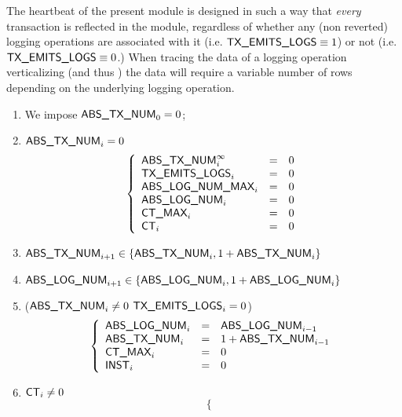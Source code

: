 The heartbeat of the present module is designed in such a way that \emph{every} transaction is reflected in the \logInfoMod{} module, regardless of whether any (non reverted) logging operations are associated with it (i.e. $\textsf{TX\_EMITS\_LOGS} \equiv 1$) or not (i.e. $\textsf{TX\_EMITS\_LOGS} \equiv 0$.) When tracing the data of a logging operation verticalizing (and thus \maxCt{}) the data will require a variable number of rows depending on the underlying logging operation. 
\begin{enumerate}
	\item We impose $\textsf{ABS\_TX\_NUM}_{0} = 0$;
	\item \If $\textsf{ABS\_TX\_NUM}_{i} = 0$ \Then
		\[
			\left\{ \begin{array}{lcl}
				\textsf{ABS\_TX\_NUM}^\infty_{i}          & = & 0 \\
				\textsf{TX\_EMITS\_LOGS}_{i}          & = & 0 \\
				\textsf{ABS\_LOG\_NUM\_MAX}_{i}         & = & 0 \\
				\textsf{ABS\_LOG\_NUM}_{i}            & = & 0 \\
				\textsf{CT\_MAX}_{i}                & = & 0 \\
				\textsf{CT}_{i}                   & = & 0 \\
			\end{array} \right.
		\]
	\item $\textsf{ABS\_TX\_NUM}_{i + 1} \in \{ \textsf{ABS\_TX\_NUM}_{i}, 1 + \textsf{ABS\_TX\_NUM}_{i} \}$
	\item $\textsf{ABS\_LOG\_NUM}_{i + 1} \in \{ \textsf{ABS\_LOG\_NUM}_{i}, 1 + \textsf{ABS\_LOG\_NUM}_{i} \}$
	\item \If \Big($\textsf{ABS\_TX\_NUM}_{i} \neq 0$ \et $\textsf{TX\_EMITS\_LOGS}_{i} = 0$\Big) \Then
		\[
			\left\{ \begin{array}{lcl}
				\absLogNum_{i}       & = & \absLogNum_{i - 1}     \\
				\absTxNum_{i}        & = & 1 + \absTxNum_{i - 1}  \\
				\maxCt_{i}           & = & 0                      \\
				\INST_{i}            & = & 0                      \\ %
			\end{array} \right.
		\]
	\item\label{log info: heartbeat: counter constancy of absTxNum and absLogNum} \If $\textsf{CT}_{i} \neq 0$ \Then
		\[
			\left\{ \begin{array}{lclr}

\end{array}\]
\end{enumerate}
